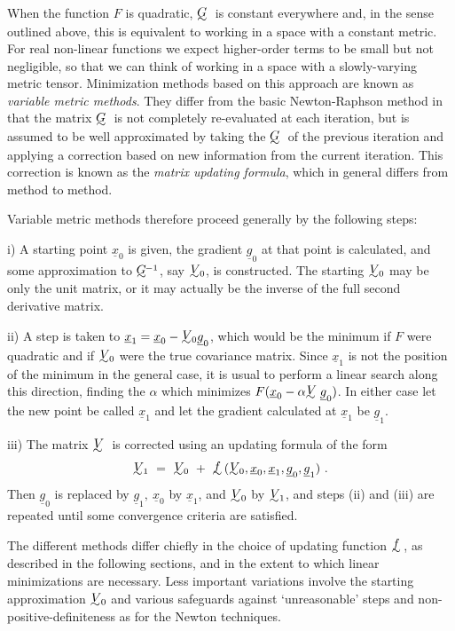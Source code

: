      When the function $F$ is quadratic, $\UTG$ is constant everywhere and, in
the sense outlined above, this is equivalent to working in a space with
a constant metric.  For real non-linear functions we expect higher-order
terms to be small but not negligible, so that we can think of working in
a space with a slowly-varying metric tensor. Minimization methods based
on this approach are known as {\em variable metric methods}.  They differ from
the basic Newton-Raphson method in that the matrix $\UTG$ is not
completely
re-evaluated at each iteration, but is assumed to be well approximated by
taking the $\UTG$ of the previous iteration and applying a correction based on
new information from the current iteration.  This correction is known as
the {\em matrix updating formula}, which in general differs from method to
method.
 
     Variable metric methods therefore proceed generally by the following
steps:
 
  i) A starting point ${\underline{x}}_0$ is given, the gradient ${\underline{g}}_0$ at that point is
     calculated, and some approximation to  $\UTG\!\!^{-1}$, say $\UTV\!\!_0$, is constructed.
     The starting $\UTV\!\!_0$ may be only the unit matrix, or it may actually be
     the inverse of the full second derivative matrix.
 
 ii) A step is taken to ${\underline{x}}_1 = {\underline{x}}_0 - \UTV\!\!_0
{\underline{g}}_0$, which would be the
minimum if $F$
     were quadratic and if $\UTV\!\!_0$ were the true covariance matrix.  Since ${\underline{x}}_1$
     is not the position of the minimum in the general case, it is usual
     to perform a linear search along this direction, finding the $\alpha$
     which minimizes $F({\underline{x}}_0 - \alpha\UTV{\underline{g}}_0)$.  In either case let the
new point be
     called ${\underline{x}}_1$ and let the gradient calculated at ${\underline{x}}_1$ 
be ${\underline{g}}_1$.
 
iii) The matrix $\UTV$ is corrected using an updating formula of the form
 $$\UTV\!\!_1~=~\UTV\!\!_0~+~\UTf(\UTV\!\!_0,{\underline{x}}_0,
{\underline{x}}_1,{\underline{g}}_0, {\underline{g}}_1)~.$$
     Then ${\underline{g}}_0$ is replaced by ${\underline{g}}_1,~ {\underline{x}}_0$ by
${\underline{x}}_1$, and $\UTV\!\!_0$ by $\UTV\!\!_1$, and steps (ii)
     and (iii) are repeated until some convergence criteria are satisfied.
 
     The different methods differ chiefly in the choice of updating
function $\UTf$, as described in the following sections, and in the extent to
which linear minimizations are necessary.  Less important variations
involve the starting approximation $\UTV\!\!_0$ and various safeguards against
`unreasonable' steps and non-positive-definiteness as for the Newton
techniques.
 

